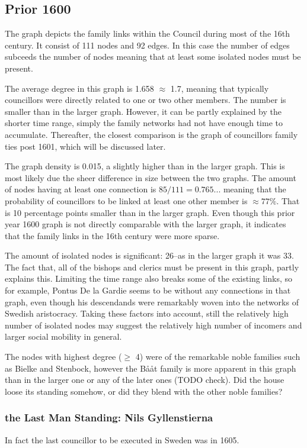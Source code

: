 \subsection{Prior 1600}
The graph depicts the family links within the Council during most of the 16th century. It consist of 111 nodes and 92 edges. In this case the number of edges subceeds the number of nodes meaning that at least some isolated nodes must be present. 

The average degree in this graph is 1.658 $\approx$ 1.7, meaning that typically councillors were directly related to one or two other members. The number is smaller than in the larger graph. However, it can be partly explained by the shorter time range, simply the family networks had not have enough time to accumulate. Thereafter, the closest comparison is the graph of councillors family ties post 1601, which will be discussed later.

The graph density is 0.015, a slightly higher than in the larger graph. This is most likely due the sheer difference in size between the two graphs. The amount of nodes having at least one connection is $85/111 = 0.765...$ meaning that the probability of councillors to be linked at least one other member is $\approx 77\%$. That is 10 percentage points smaller than in the larger graph. Even though this prior year 1600 graph is not directly comparable with the larger graph, it indicates that the family links in the 16th century were more sparse.

The amount of isolated nodes is significant: 26–as in the larger graph it was 33. The fact that, all of the bishops and clerics must be present in this graph, partly explains this. Limiting the time range also breaks some of the existing links, so for example, Pontus De la Gardie seems to be without any connections in that graph, even though his descendands were remarkably woven into the networks of Swedish aristocracy. Taking these factors into account, still the relatively high number of isolated nodes may suggest the relatively high number of incomers and larger social mobility in general.

The nodes with highest degree ($\geq$ 4) were of the remarkable noble families such as Bielke and Stenbock, however the Bååt family is more apparent in this graph than in the larger one or any of the later ones (TODO check). Did the house loose its standing somehow, or did they blend with the other noble families?

\subsubsection{the Last Man Standing: Nils Gyllenstierna}
In fact the last councillor to be executed in Sweden was in 1605.%

